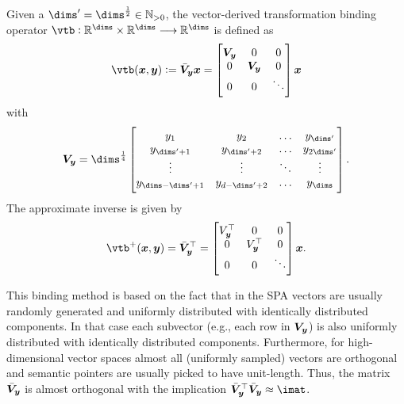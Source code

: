 \begin{defn}
    Given a $\dims' = \dims^{\frac{1}{2}} \in \mathbb{N}_{>0}$, the vector-derived transformation binding operator $\vtb: \mathbb{R}^{\dims} \times \mathbb{R}^{\dims} \longrightarrow \mathbb{R}^{\dims}$ is defined as
    \begin{equation}
        \vtb(\vc x, \vc y) := \bar{\mat V}_{\vc y} \vc x = \begin{bmatrix}
            \mat V_{\vc y} & 0 & 0 \\
            0 & \mat V_{\vc y} & 0 \\
            0 & 0 & \ddots
        \end{bmatrix} \vc x
    \end{equation}
    with
    \begin{equation}
        \mat V_{\vc y} = \dims^{\frac{1}{4}} \begin{bmatrix}
            y_1 & y_2 & \dotso & y_{\dims'} \\
            y_{\dims' + 1} & y_{\dims' + 2} & \dotso & y_{2\dims'} \\
            \vdots & \vdots & \ddots & \vdots \\
            y_{\dims - \dims' + 1} & y_{d - \dims' + 2} & \dotso & y_{\dims}
        \end{bmatrix} \text{.}
    \end{equation}
    The approximate inverse is given by
    \begin{equation}
        \vtb^+(\vc x, \vc y) = \bar{\mat V}_{\vc y}\Tr = \begin{bmatrix}
            V_{\vc y}\Tr & 0 & 0 \\
            0 & V_{\vc y}\Tr & 0 \\
            0 & 0 & \ddots
        \end{bmatrix} \vc x \text{.}
    \end{equation}
\end{defn}
This binding method is based on the fact that in the SPA vectors are usually randomly generated and uniformly distributed with identically distributed components.
In that case each subvector (e.g., each row in $\bm{V}_{\bm{y}}$) is also uniformly distributed with identically distributed components.
Furthermore, for high-dimensional vector spaces almost all (uniformly sampled) vectors are orthogonal and semantic pointers are usually picked to have unit-length.
Thus, the matrix $\bar{\bm{V}}_{\bm{y}}$ is almost orthogonal with the implication $\bar{\mat V}_{\vc y}\Tr \bar{\mat V}_{\vc y} \approx \imat$.
